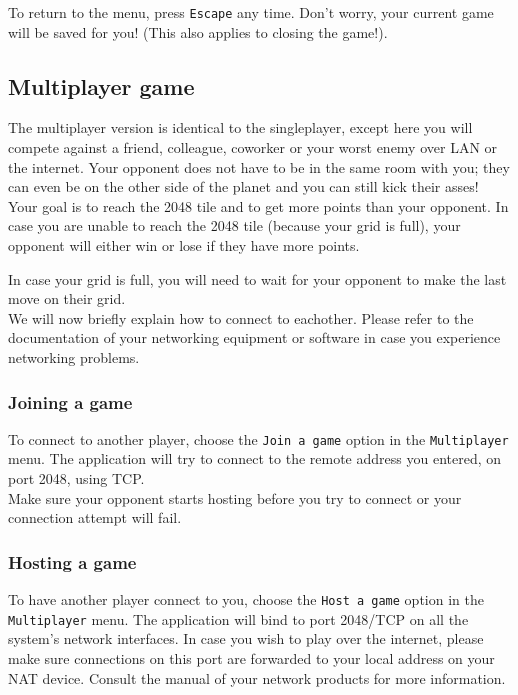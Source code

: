 \documentclass[a4paper,11pt,report]{scrartcl}
\begin{document}
To return to the menu, press \texttt{Escape} any time. Don't worry,
your current game will be saved for you! (This also applies to closing the
game!).

\subsection{Multiplayer game}
The multiplayer version is identical to the singleplayer, except here you will
compete against a friend, colleague, coworker or your worst enemy over LAN or
the internet. Your opponent does not have to be in the same room with you; they
can even be on the other side of the planet and you can still kick their
asses!\\

Your goal is to reach the 2048 tile and to get more points than your opponent.  In case you
are unable to reach the 2048 tile (because your grid is full), your opponent will either win or lose if they have more points. 

In case your grid is full, you will need to wait for your opponent to make the last move on their grid.\\

We will now briefly explain how to connect to eachother. Please refer to the
documentation of your networking equipment or software in case you experience
networking problems.

\subsubsection{Joining a game}
To connect to another player, choose the \texttt{Join a game} option in the
\texttt{Multiplayer} menu. The application will try to connect to the remote address you
entered, on port 2048, using TCP.\\
Make sure your opponent starts hosting before you try to connect or your connection attempt will fail.

\subsubsection{Hosting a game}
To have another player connect to you, choose the \texttt{Host a game} option
in the \texttt{Multiplayer} menu. The application will bind to port 2048/TCP on all the
system's network interfaces. In case you wish to play over the internet,
please make sure connections on this port are forwarded to your local address
on your NAT device. Consult the manual of your network products for more 
information.
\end{document}
